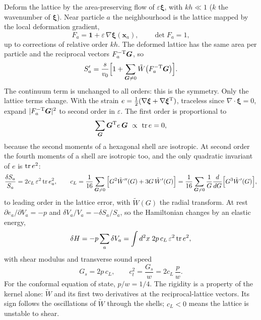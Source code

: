 \documentclass[11pt,aps,preprint,nofootinbib,superscriptaddress,tightenlines]{revtex4-2}
\def\st{\begin{equation}}
\def\stp{\end{equation}}
\begin{document}
Deform the lattice by the area-preserving flow of $\varepsilon\bm\xi$, with $kh\ll1$ ($k$ the
wavenumber of $\bm\xi$).  Near particle $a$ the neighbourhood is the lattice mapped by the local
deformation gradient,
\st
F_a=\mathbf 1+\varepsilon\,\nabla\bm\xi(\bm x_a),\qquad \det F_a=1 ,
\stp
up to corrections of relative order $kh$.  The deformed lattice has the same area per particle
and the reciprocal vectors $F_a^{-\rm T}\bm G$, so
\st
S_a'=\frac{s}{v_0}\Big[1+\sum_{\bm G\neq0}\tilde W\big(F_a^{-\rm T}\bm G\big)\Big].
\label{poissonF}
\stp
The continuum term is unchanged to all orders: this is the symmetry.  Only the lattice terms
change.  With the strain $e=\tfrac12(\nabla\bm\xi+\nabla\bm\xi^{\rm T})$, traceless since
$\nabla\cdot\bm\xi=0$, expand $|F_a^{-\rm T}\bm G|^2$ to second order in $\varepsilon$.  The first
order is proportional to
\st
\sum_{\bm G}\bm G^{\rm T}e\,\bm G\ \propto\ {\rm tr}\,e=0 ,
\stp
because the second moments of a hexagonal shell are isotropic.  At second order the fourth
moments of a shell are isotropic too, and the only quadratic invariant of $e$ is ${\rm tr}\,e^2$:
\st
\frac{\delta S_a}{S_a}=2c_L\,\varepsilon^2\,{\rm tr}\,e_a^2,\qquad
c_L=\frac1{16}\sum_{\bm G\neq0}\Big[G^2\tilde W''(G)+3G\,\tilde W'(G)\Big]
=\frac1{16}\sum_{\bm G\neq0}\frac1G\frac{d}{dG}\Big[G^3\tilde W'(G)\Big],
\label{cL}
\stp
to leading order in the lattice error, with $\tilde W(G)$ the radial transform.  At rest
$\partial e_a/\partial V_a=-p$ and $\delta V_a/V_a=-\delta S_a/S_a$, so the Hamiltonian changes by
an elastic energy,
\st
\delta H=-p\sum_a\delta V_a=\int d^2x\;2p\,c_L\,\varepsilon^2\,{\rm tr}\,e^2 ,
\label{dHel}
\stp
with shear modulus and transverse sound speed
\st
G_s=2p\,c_L,\qquad c_t^2=\frac{G_s}{w}=2c_L\,\frac pw .
\label{ctcL}
\stp
For the conformal equation of state, $p/w=1/4$.  The rigidity is a property of the kernel
alone: $\tilde W$ and its first two derivatives at the reciprocal-lattice vectors.  Its sign
follows the oscillations of $\tilde W$ through the shells; $c_L<0$ means the lattice is unstable
to shear.
\end{document}
